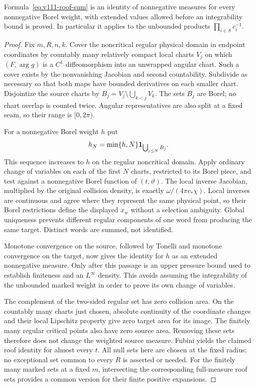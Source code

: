\begin{proposition}
\label{prop:v112-exhaustion}
Formula~\eqref{eq:v111-roof-sum} is an identity of nonnegative
measures for every nonnegative Borel weight, with extended values
allowed before an integrability bound is proved. In particular it
applies to the unbounded products $\prod_{i\in S}c_i^{-1}$.
\end{proposition}
\begin{proof}
Fix $m,R,n,k$. Cover the noncritical regular physical domain in
endpoint coordinates by countably many relatively compact local
charts $V_j$ on which $(F,\arg g)$ is a $C^1$ diffeomorphism into
an unwrapped angular chart. Such a cover exists by the nonvanishing
Jacobian and second countability. Subdivide as necessary so that
both maps have bounded derivatives on each smaller chart.
Disjointize the source charts by
$B_j=V_j\setminus\bigcup_{k<j}V_k$. The sets $B_j$ are Borel;
no chart overlap is counted twice. Angular representatives are also
split at a fixed seam, so their range is $[0,2\pi)$.

For a nonnegative Borel weight $h$ put
\[
 h_N=\min\{h,N\}\mathbf1_{\bigcup_{j\le N}B_j}.
\]
This sequence increases to $h$ on the regular noncritical domain.
Apply ordinary change of variables on each of the first $N$
charts, restricted to its Borel piece, and test against a
nonnegative Borel function of $(t,\vartheta)$. The local inverse
Jacobian, multiplied by the original collision density, is exactly
$\omega/(4\pi c_*\chi)$. Local inverses are continuous and agree
where they represent the same physical point, so their Borel
restrictions define the displayed $x_w$ without a selection ambiguity.
Global uniqueness prevents different regular components of one word
from producing the same target. Distinct words are summed, not
identified.

Monotone convergence on the source, followed by Tonelli and monotone
convergence on the target, now gives the identity for $h$ as an
extended nonnegative measure. Only after this passage is an upper
pressure bound used to establish finiteness and an $L^\infty$
density. This avoids assuming the integrability of the unbounded
marked weight in order to prove its own change of variables.

The complement of the two-sided regular set has zero collision
area. On the countably many charts just chosen, absolute continuity
of the coordinate changes and their local Lipschitz property give
zero target area for its image. The finitely many regular critical
points also have zero source area. Removing these sets therefore
does not change the weighted source measure. Fubini yields the
claimed roof identity for almost every $t$. All null sets here are
chosen at the fixed radius; no exceptional set common to every
$R$ is asserted or needed. For the finitely many marked sets at a
fixed $m$, intersecting the corresponding full-measure roof sets
provides a common version for their finite positive expansions.
\end{proof}
